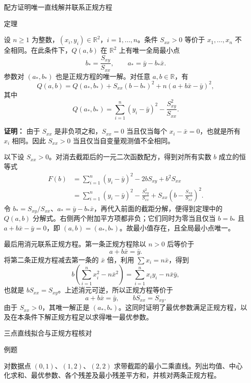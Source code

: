 \documentclass[aspectratio=169,10pt,fontset=fandol]{ctexbeamer}
\begin{document}
\begin{frame}[t,fragile]{配方证明唯一直线解并联系正规方程}
\small
\begin{block}{定理}
{\small
设 $n\geq1$ 为整数，$(x_i,y_i)\in\mathbb{R}^2$，$i=1,\ldots,n$。条件 $S_{xx}>0$ 等价于 $x_1,\ldots,x_n$ 不全相同。在此条件下，$Q(a,b)$ 在 $\mathbb{R}^2$ 上有唯一全局最小点
\[
b_* =\frac{S_{xy}}{S_{xx}},\qquad a_* =\bar{y}-b_*\bar{x}.
\]
参数对 $(a_*,b_*)$ 也是正规方程的唯一解。对任意 $a,b\in\mathbb{R}$，有
\[
Q(a,b)=Q(a_*,b_*)+S_{xx}(b-b_*)^2+n(a+b\bar{x}-\bar{y})^2,
\]
其中
\[
Q(a_*,b_*)=\sum_{i=1}^{n}(y_i-\bar{y})^2-\frac{S_{xy}^2}{S_{xx}}.
\]

}
\end{block}
\pause
{\small
\textbf{证明：}
由于 $S_{xx}$ 是非负项之和，$S_{xx}=0$ 当且仅当每个 $x_i-\bar{x}=0$，也就是所有 $x_i$ 相同。因此 $S_{xx}>0$ 当且仅当自变量观测值不全相同。

以下设 $S_{xx}>0$。对消去截距后的一元二次函数配方，得到对所有实数 $b$ 成立的恒等式
\[
\begin{aligned}
F(b)
&=\sum_{i=1}^{n}(y_i-\bar{y})^2-2bS_{xy}+b^2S_{xx}\\
&=\sum_{i=1}^{n}(y_i-\bar{y})^2-\frac{S_{xy}^2}{S_{xx}}
  +S_{xx}\left(b-\frac{S_{xy}}{S_{xx}}\right)^2.
\end{aligned}
\]
令 $b_*=S_{xy}/S_{xx}$、$a_*=\bar{y}-b_*\bar{x}$，再代入前面的截距分解，便得到定理中的 $Q(a,b)$ 分解式。右侧两个附加平方项都非负；它们同时为零当且仅当 $b=b_*$ 且 $a+b\bar{x}-\bar{y}=0$，即 $(a,b)=(a_*,b_*)$。故最小值存在，且全局最小点唯一。

最后用消元联系正规方程。第一条正规方程除以 $n>0$ 后等价于
\[
a+b\bar{x}=\bar{y}.
\]
将第二条正规方程减去第一条的 $\bar{x}$ 倍，利用 $\sum x_i=n\bar{x}$，得到
\[
b\left(\sum_{i=1}^{n}x_i^2-n\bar{x}^2\right)
=\sum_{i=1}^{n}x_i y_i-n\bar{x}\bar{y},
\]
也就是 $bS_{xx}=S_{xy}$。上述消元可逆，所以正规方程等价于
\[
a+b\bar{x}=\bar{y},\qquad bS_{xx}=S_{xy}.
\]
由于 $S_{xx}>0$，其唯一解正是 $(a_*,b_*)$。这同时证明了最优参数满足正规方程，以及在本条件下解正规方程足以求得唯一最优参数。

}
\end{frame}
\begin{frame}[t,fragile]{三点直线拟合与正规方程核对}
\normalsize
\begin{block}{例题}
{\normalsize
对数据点 $(0,1)$、$(1,2)$、$(2,2)$ 求带截距的最小二乘直线。列出均值、中心化求和、最优参数、各个残差及最小残差平方和，并核对两条正规方程。

}
\end{block}
\end{frame}
\end{document}
